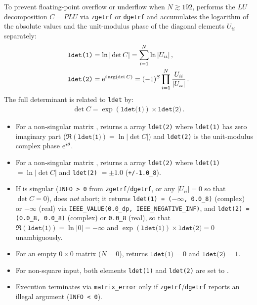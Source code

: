 To prevent floating-point overflow or underflow when $N \gtrsim 192$,  performs the $LU$ decomposition $C = P L U$ via \texttt{zgetrf} or \texttt{dgetrf} and accumulates the logarithm of the absolute values and the unit-modulus phase of the diagonal elements $U_{ii}$ separately:
\begin{align}
  \texttt{ldet(1)} &= \ln|\det C| = \sum_{i=1}^{N} \ln|U_{ii}|\, , \\
  \texttt{ldet(2)} &= {\rm e}^{i\arg(\det C)} = (-1)^{S} \prod_{i=1}^{N} \frac{U_{ii}}{|U_{ii}|}\, .
\end{align}
The full determinant is related to \texttt{ldet} by:
\begin{align}
  \det C = \exp(\texttt{ldet(1)}) \times \texttt{ldet(2)}\, .
\end{align}
\begin{itemize}
  \item For a non-singular  matrix ,  returns a  array \texttt{ldet(2)} where \texttt{ldet(1)} has zero imaginary part ($\Re(\texttt{ldet(1)}) = \ln|\det C|$) and \texttt{ldet(2)} is the unit-modulus complex phase ${\rm e}^{i\theta}$.
  \item For a non-singular  matrix ,  returns a  array \texttt{ldet(2)} where \texttt{ldet(1)} $= \ln|\det C|$ and \texttt{ldet(2)} $= \pm 1.0$ (\texttt{+/-1.0\_8}).
  \item If  is singular (\texttt{INFO > 0} from \texttt{zgetrf}/\texttt{dgetrf}, or any $|U_{ii}| = 0$ so that $\det C = 0$),  does \emph{not} abort; it returns \texttt{ldet(1) = (}$-\infty$\texttt{, 0.0\_8)} (complex) or $-\infty$ (real) via \texttt{IEEE\_VALUE(0.0\_dp, IEEE\_NEGATIVE\_INF)}, and \texttt{ldet(2) = (0.0\_8, 0.0\_8)} (complex) or \texttt{0.0\_8} (real), so that $\Re(\texttt{ldet(1)}) = \ln|0| = -\infty$ and $\exp(\texttt{ldet(1)}) \times \texttt{ldet(2)} = 0$ unambiguously.
  \item For an empty $0\times 0$ matrix ($N = 0$),  returns $\texttt{ldet(1)} = 0$ and $\texttt{ldet(2)} = 1$.
  \item For non-square input, both elements \texttt{ldet(1)} and \texttt{ldet(2)} are set to .
  \item Execution terminates via \texttt{matrix\_error} only if \texttt{zgetrf}/\texttt{dgetrf} reports an illegal argument (\texttt{INFO < 0}).
\end{itemize}

